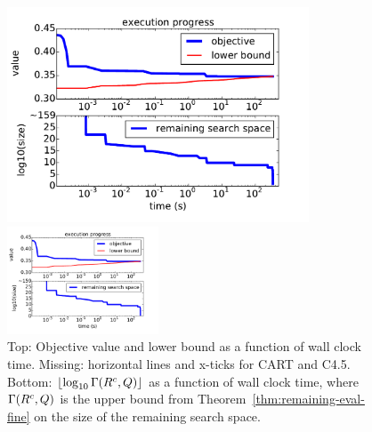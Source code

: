 \begin{figure}[t!]
\begin{center}
\begin{arxiv}
\includegraphics[width=0.8\textwidth]{figs/ela_compas-remaining-space.pdf}
\end{arxiv}
\begin{kdd}
\includegraphics[width=0.4\textwidth]{figs/ela_compas-remaining-space.pdf}
\end{kdd}
\end{center}
\caption{Top: Objective value and lower bound as a function of wall clock time.
%
Missing: horizontal lines and x-ticks for CART and C4.5.
%
Bottom:
$\lfloor \log_{10} \Gamma({R^c}, Q) \rfloor$
as a function of wall clock time,
where~$\Gamma({R^c}, Q)$ is the upper bound
from Theorem~\ref{thm:remaining-eval-fine}
on the size of the remaining search space.}
\label{fig:objective}
\end{figure}

